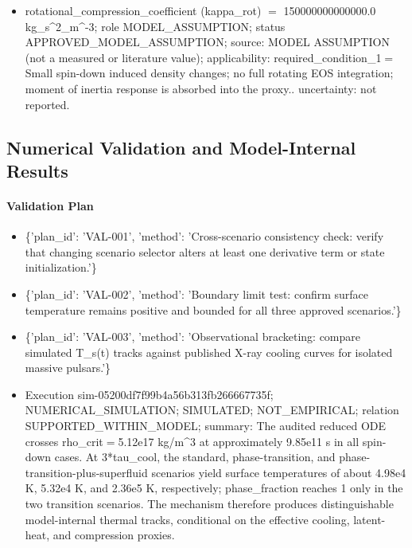 \documentclass[11pt]{article}
\begin{document}
\begin{itemize}
\item rotational\_compression\_coefficient (kappa\_rot) \ensuremath{=} 150000000000000.0 kg\_s\textasciicircum{}2\_m\textasciicircum{}-3; role MODEL\_ASSUMPTION; status APPROVED\_MODEL\_ASSUMPTION; source: MODEL ASSUMPTION (not a measured or literature value); applicability: required\_condition\_1\ensuremath{=}Small spin-down induced density changes; no full rotating EOS integration; moment of inertia response is absorbed into the proxy.. uncertainty: not reported.
\end{itemize}

\subsection{Numerical Validation and Model-Internal Results}

\paragraph{Validation Plan}
\begin{itemize}
\item \{'plan\_id': 'VAL-001', 'method': 'Cross-scenario consistency check: verify that changing scenario selector alters at least one derivative term or state initialization.'\}
\item \{'plan\_id': 'VAL-002', 'method': 'Boundary limit test: confirm surface temperature remains positive and bounded for all three approved scenarios.'\}
\item \{'plan\_id': 'VAL-003', 'method': 'Observational bracketing: compare simulated T\_s(t) tracks against published X-ray cooling curves for isolated massive pulsars.'\}
\end{itemize}

\begin{itemize}
\item Execution sim-05200df7f99b4a56b313fb266667735f; NUMERICAL\_SIMULATION; SIMULATED; NOT\_EMPIRICAL; relation SUPPORTED\_WITHIN\_MODEL; summary: The audited reduced ODE crosses rho\_crit\ensuremath{=}5.12e17 kg/m\textasciicircum{}3 at approximately 9.85e11 s in all spin-down cases. At 3*tau\_cool, the standard, phase-transition, and phase-transition-plus-superfluid scenarios yield surface temperatures of about 4.98e4 K, 5.32e4 K, and 2.36e5 K, respectively; phase\_fraction reaches 1 only in the two transition scenarios. The mechanism therefore produces distinguishable model-internal thermal tracks, conditional on the effective cooling, latent-heat, and compression proxies.
\end{itemize}
\end{document}
